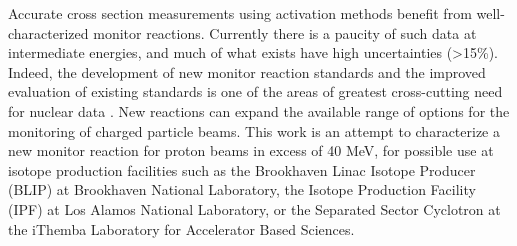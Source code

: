 \documentclass[3p]{elsarticle}
\newcommand{\comment}[1]{\todo[color=blue!20!white,inline]{ASV: #1}}
\begin{document}
Accurate cross section measurements using  activation methods benefit from well-characterized monitor reactions.  
Currently there is 
a paucity of such data at intermediate energies, and much of what exists have  high uncertainties (\textgreater15\%).
Indeed, the development of new monitor reaction standards and the improved evaluation of existing standards is one of the areas of greatest cross-cutting need for nuclear data \cite{bernstein2015nuclear}. 
New reactions can expand the available range of options for the monitoring of charged particle beams.
This work 
is an attempt to characterize a new monitor reaction for  proton beams in excess of 40 MeV, for possible use at isotope production facilities such as the  Brookhaven Linac Isotope Producer (BLIP) at Brookhaven National Laboratory, 
the Isotope Production Facility (IPF) at  Los Alamos National Laboratory, or the Separated Sector Cyclotron at the 
iThemba Laboratory for Accelerator Based Sciences.
\end{document}
